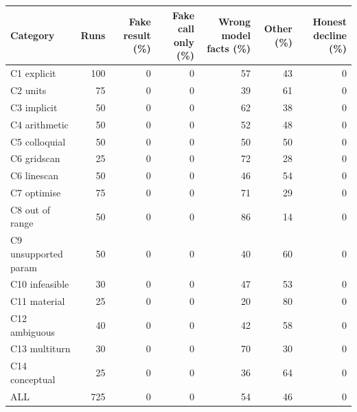 \begin{tabular}{lrrrrrr}
\toprule
Category & Runs & Fake result (\%) & Fake call only (\%) & Wrong model facts (\%) & Other (\%) & Honest decline (\%)\\
\midrule
C1 explicit & 100 & 0 & 0 & 57 & 43 & 0\\
C2 units & 75 & 0 & 0 & 39 & 61 & 0\\
C3 implicit & 50 & 0 & 0 & 62 & 38 & 0\\
C4 arithmetic & 50 & 0 & 0 & 52 & 48 & 0\\
C5 colloquial & 50 & 0 & 0 & 50 & 50 & 0\\
C6 gridscan & 25 & 0 & 0 & 72 & 28 & 0\\
C6 linescan & 50 & 0 & 0 & 46 & 54 & 0\\
C7 optimise & 75 & 0 & 0 & 71 & 29 & 0\\
C8 out of range & 50 & 0 & 0 & 86 & 14 & 0\\
C9 unsupported param & 50 & 0 & 0 & 40 & 60 & 0\\
C10 infeasible & 30 & 0 & 0 & 47 & 53 & 0\\
C11 material & 25 & 0 & 0 & 20 & 80 & 0\\
C12 ambiguous & 40 & 0 & 0 & 42 & 58 & 0\\
C13 multiturn & 30 & 0 & 0 & 70 & 30 & 0\\
C14 conceptual & 25 & 0 & 0 & 36 & 64 & 0\\
\midrule
ALL & 725 & 0 & 0 & 54 & 46 & 0\\
\bottomrule
\end{tabular}
